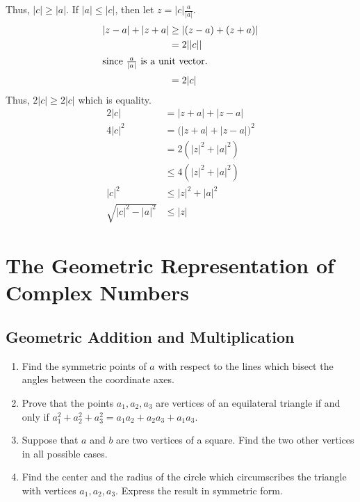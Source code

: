 \begin{enumerate}
  Thus, \(\lvert c\rvert\geq\lvert a\rvert\).
  If \(\lvert a\rvert\leq\lvert c\rvert\), then let
  \(z = \lvert c\rvert\frac{a}{\lvert a\rvert}\).
  \begin{align*}
    \lvert z - a\rvert + \lvert z + a\rvert
    & \geq \lvert (z - a) + (z + a)\rvert\\
    & = 2\lvert\lvert c\rvert\rvert\\
    \intertext{since \(\frac{a}{\lvert a\rvert}\) is a unit vector.}
    & = 2\lvert c\rvert
  \end{align*}
  Thus, \(2\lvert c\rvert\geq 2\lvert c\rvert\) which is equality.
  \begin{align*}
    2\lvert c\rvert & = \lvert z + a\rvert + \lvert z - a\rvert\\
    4\lvert c\rvert^2 & =
                        \bigl(\lvert z + a\rvert + \lvert z - a\rvert\bigr)^2\\
                    & = 2(\lvert z\rvert^2 + \lvert a\rvert^2)\\
                    & \leq 4(\lvert z\rvert^2 + \lvert a\rvert^2)\\
    \lvert c\rvert^2 & \leq \lvert z\rvert^2 + \lvert a\rvert^2\\
    \sqrt{\lvert c\rvert^2 - \lvert a\rvert^2} & \leq \lvert z\rvert
  \end{align*}
\end{enumerate}

\section{The Geometric Representation of Complex Numbers}

\subsection{Geometric Addition and Multiplication}

\begin{enumerate}
\item
  Find the symmetric points of \(a\) with respect to the lines which bisect the
  angles between the coordinate axes.
\item
  Prove that the points \(a_1,a_2,a_3\) are vertices of an equilateral triangle
  if and only if \(a_1^2 + a_2^2 + a_3^2 = a_1a_2 + a_2a_3 + a_1a_3\).
\item
  Suppose that \(a\) and \(b\) are two vertices of a square.
  Find the two other vertices in all possible cases.
\item
  Find the center and the radius of the circle which circumscribes the triangle
  with vertices \(a_1,a_2,a_3\).
  Express the result in symmetric form.
\end{enumerate}

